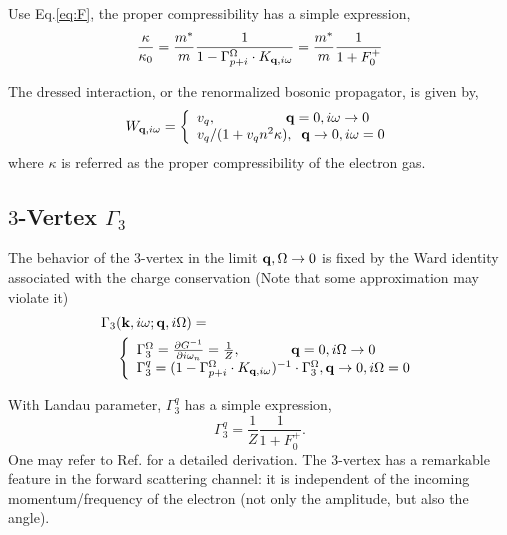 \documentclass[reprint,amsmath,amssymb,aps,prb]{revtex4-1}
\begin{document}
Use Eq.\eqref{eq:F}, the proper compressibility has a simple expression,
\begin{equation}
    \frac{\kappa}{\kappa_0}=\frac{m^*}{m}\frac{1}{1-\Gamma_{p+i}^\Omega \cdot K_{\mathbf{q}, i\omega}}=\frac{m^*}{m}\frac{1}{1+F_0^+}
\end{equation}

The dressed interaction, or the renormalized bosonic propagator, is given by,
\begin{equation}
    \label{eq:interaction}
    W_{\mathbf{q}, i\omega}=\left\{
    \begin{array}{ll}
        v_q, \;\;\;\;\;\;\;\;\;\;\;\;\;\;\;\;\;\; \mathbf{q}=0, i\omega \rightarrow 0 \\
        v_q/(1+v_q n^2 \kappa), \;\; \mathbf{q}\rightarrow 0, i\omega=0
    \end{array}
    \right.
\end{equation}
where $\kappa$ is referred as the proper compressibility of the electron gas.

\subsection{$3$-Vertex $\Gamma_3$}

The behavior of the $3$-vertex in the limit $\mathbf{q}, \Omega \rightarrow 0$ is fixed by the Ward identity associated with the charge conservation (Note that some approximation may violate it)
\begin{align}
    \label{eq:gamma3}
    \Gamma_3 & (\mathbf{k}, i\omega; \mathbf{q}, i\Omega)= \nonumber \\
             & \left\{
    \begin{array}{ll}
        \Gamma_3^\Omega= \frac{\partial G^{-1}}{\partial i\omega_n}=\frac{1}{Z}, \;\;\;\;\;\;\;\;\;\;\;\;\; \mathbf{q} = 0, i\Omega \rightarrow 0 \\
        \Gamma_3^q =(1-\Gamma_{p+i}^\Omega \cdot K_{\mathbf{q}, i\omega})^{-1}\cdot\Gamma_3^\Omega,
        \mathbf{q} \rightarrow 0, i\Omega =0
    \end{array}
    \right.
\end{align}

With Landau parameter, $\Gamma_3^q$ has a simple expression,
\begin{equation}
    \Gamma_3^q=\frac{1}{Z}\frac{1}{1+F_0^+}.
\end{equation}
One may refer to Ref.  for a detailed derivation. The $3$-vertex has a remarkable feature in the forward scattering channel: it is independent of the incoming momentum/frequency of the electron (not only the amplitude, but also the angle).
\end{document}
